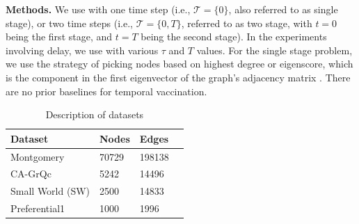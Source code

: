 \noindent
\textbf{Methods.}
We use \algo{} with one time step (i.e., $\mathcal{T}=\{0\}$, also referred to as single stage), or two time steps (i.e., $\mathcal{T}=\{0, T\}$, referred to as two stage, with $t=0$ being the first stage, and $t=T$ being the second stage). In the experiments involving delay, we use \algodelay{} with various $\tau$ and $T$ values. For the single stage problem, we use the strategy of picking nodes based on highest degree or eigenscore, which is the component in the first eigenvector of the graph's adjacency matrix \cite{tong:cikm12}.
There are no prior baselines for temporal vaccination. 





\begin{table}[!h]
\centering
\begin{tabular}{llll}
\hline
 \textbf{Dataset} & \textbf{Nodes} & \textbf{Edges}   \\ \hline
 Montgomery & 70729 & 198138 \\
 CA-GrQc & 5242 & 14496\\
 Small World (SW) & 2500 & 14833 \\   
 Preferential1 & 1000 & 1996 \\ \hline
\end{tabular}
\caption{Description of datasets}
\label{tab:datasets}
\end{table}

